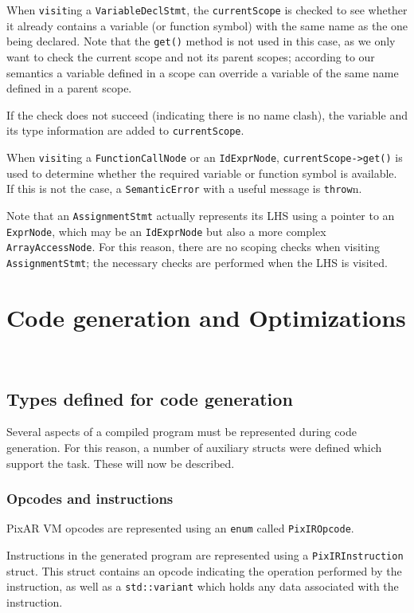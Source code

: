 \documentclass[11pt,a4paper]{scrartcl}
\begin{document}
When \verb|visit|ing a \verb|VariableDeclStmt|, the \verb|currentScope| is checked to see whether it already contains a variable (or function symbol) with the same name as the one being declared. Note that the \verb|get()| method is not used in this case, as we only want to check the current scope and not its parent scopes; according to our semantics a variable defined in a scope can override a variable of the same name defined in a parent scope.

If the check does not succeed (indicating there is no name clash), the variable and its type information are added to \verb|currentScope|.

When \verb|visit|ing a \verb|FunctionCallNode| or an \verb|IdExprNode|, \verb|currentScope->get()| is used to determine whether the required variable or function symbol is available. If this is not the case, a \verb|SemanticError| with a useful message is \verb|throw|n.

Note that an \verb|AssignmentStmt| actually represents its LHS using a pointer to an \verb|ExprNode|, which may be an \verb|IdExprNode| but also a more complex \verb|ArrayAccessNode|. For this reason, there are no scoping checks when visiting \verb|AssignmentStmt|; the necessary checks are performed when the LHS is visited.

\newpage

\section{Code generation and Optimizations}~\label{sec:codegen}

\subsection{Types defined for code generation}

Several aspects of a compiled program must be represented during code generation. For this reason, a number of auxiliary structs were defined which support the task. These will now be described.

\subsubsection{Opcodes and instructions}

PixAR VM opcodes are represented using an \verb|enum| called \verb|PixIROpcode|.

Instructions in the generated program are represented using a \verb|PixIRInstruction| struct. This struct contains an opcode indicating the operation performed by the instruction, as well as a \verb|std::variant| which holds any data associated with the instruction.
\end{document}
